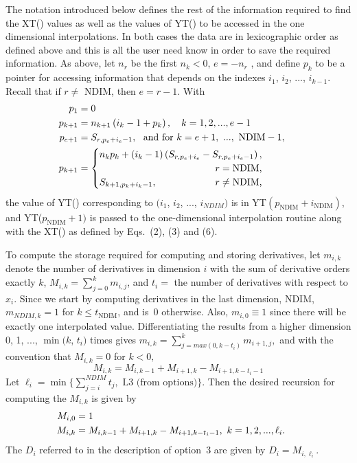 \documentclass[twoside]{MATH77}
\begin{document}
The notation introduced below defines the rest of the information required
to find the XT() values as well as the values of YT() to be accessed in the one
dimensional interpolations. In both cases the data are in lexicographic
order as defined above and this is all the user need know in order to save
the required information. As above, let $n_r$ be the first $n_k<0$, $e=-n_r$%
, and define $p_k$ to be a pointer for accessing information that depends on
the indexes $i_1$, $i_2$, ..., $i_{k-1}$. Recall that if $r\neq $ NDIM, then
$e=r-1$. With
\begin{equation}\label{O6}
\hspace{-15pt}\begin{split}
   p_1 &= 0\\
   p_{k+1} &= n_{k+1}\left( i_k-1+p_k\right) ,\quad k=1,2,...,e-1\\
   p_{e+1} &= S_{r,p_e+i_e-1},\ \text{ and for }k=e+1,\ ...,\text{ NDIM}-1,\\
   p_{k+1} &=
\begin{cases}
n_kp_k+\left( i_k-1\right)\left( S_{r,p_e+i_e}-S_{r,p_e+i_e-1}\right)
,\\
\hfill r=\text{NDIM,}\\
S_{k+1,p_k+i_k-1},\hfill r\neq \text{NDIM,}
\end{cases}
\end{split}
\end{equation}
the value of YT() corresponding to $(i_1$, $i_2$, ..., $i_{NDIM})
$ is in YT$(p_{\text{NDIM}}+i_{\text{NDIM}})$, and YT($p_{\text{NDIM}}+1)$
is passed to the one-dimensional interpolation routine along with the XT() as
defined by Eqs.\ (2), (3) and (6).

To compute the storage required for computing and storing derivatives, let $%
m_{i,k}$ denote the number of derivatives in dimension $i$ with the sum of
derivative orders exactly $k$, $M_{i,k}=\sum _{j=0}^k m_{i,j}$, and $t_i=$
the number of derivatives with respect
to $x_i$. Since we start by computing derivatives in the last
dimension, NDIM, $m_{NDIM,k}=1$ for $k\leq t_{\text{NDIM}}$, and is~0
otherwise. Also, $m_{i,0}\equiv 1$ since there will be exactly one
interpolated value. Differentiating the results from a higher dimension
0, 1, ..., $\min (k$, $t_i)$ times gives $m_{i,k} =
\sum _{j=max(0,k-t_i)}^k m_{i+1,j},$ and
with the convention that $M_{i,k}=0$ for $k<0,$%
\begin{equation}
\label{O7}M_{i,k}=M_{i,k-1}+M_{i+1,k}-M_{i+1,k-t_i-1}
\end{equation}
Let $\ell _i = \min \{\sum_{j=i}^{NDIM} t_j,\text{ L3 (from options)}\}.$
Then the desired recursion for computing the $M_{i,k}$ is given by
\begin{align}\label{O8}
\hspace{-15pt}M_{i,0}&=1\\
\hspace{-15pt}M_{i,k}&=M_{i,k-1}+M_{i+1,k}-M_{i+1,k-t_i-1},\
k=1,2,...,\ell_i.\notag
\end{align}
The $D_i$ referred to in the description of option~3 are given by
$D_i =M_{i,\ell_i}.$
\end{document}
